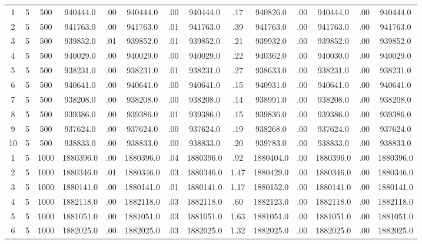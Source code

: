 \documentclass[12pt,a4paper]{article}
\begin{document}
\begin{center}
{\begin{tabular}{|ccc|cc|cc|cc|cc|cc|c|}
1             &   5& 500& 940444.0&  .00& 940444.0&  .00& 940444.0&  .17& 940826.0&  .00& 940444.0&  .00& 940444.0\\[-0.01in]
2             &   5& 500& 941763.0&  .00& 941763.0&  .01& 941763.0&  .39& 941763.0&  .00& 941763.0&  .00& 941763.0\\[-0.01in]
3             &   5& 500& 939852.0&  .01& 939852.0&  .01& 939852.0&  .21& 939932.0&  .00& 939852.0&  .00& 939852.0\\[-0.01in]
4             &   5& 500& 940029.0&  .00& 940029.0&  .00& 940029.0&  .22& 940362.0&  .00& 940030.0&  .00& 940029.0\\[-0.01in]
5             &   5& 500& 938231.0&  .00& 938231.0&  .01& 938231.0&  .27& 938633.0&  .00& 938231.0&  .00& 938231.0\\[-0.01in]
6             &   5& 500& 940641.0&  .00& 940641.0&  .00& 940641.0&  .15& 940931.0&  .00& 940641.0&  .00& 940641.0\\[-0.01in]
7             &   5& 500& 938208.0&  .00& 938208.0&  .00& 938208.0&  .14& 938991.0&  .00& 938208.0&  .00& 938208.0\\[-0.01in]
8             &   5& 500& 939386.0&  .00& 939386.0&  .01& 939386.0&  .15& 939836.0&  .00& 939386.0&  .00& 939386.0\\[-0.01in]
9             &   5& 500& 937624.0&  .00& 937624.0&  .00& 937624.0&  .19& 938268.0&  .00& 937624.0&  .00& 937624.0\\[-0.01in]
10            &   5& 500& 938833.0&  .00& 938833.0&  .00& 938833.0&  .20& 939783.0&  .00& 938833.0&  .00& 938833.0\\[-0.01in]
1             &   5&1000&1880396.0&  .00&1880396.0&  .04&1880396.0&  .92&1880404.0&  .00&1880396.0&  .00&1880396.0\\[-0.01in]
2             &   5&1000&1880346.0&  .01&1880346.0&  .03&1880346.0& 1.47&1880429.0&  .00&1880346.0&  .00&1880346.0\\[-0.01in]
3             &   5&1000&1880141.0&  .00&1880141.0&  .01&1880141.0& 1.17&1880152.0&  .00&1880141.0&  .00&1880141.0\\[-0.01in]
4             &   5&1000&1882118.0&  .00&1882118.0&  .03&1882118.0&  .60&1882123.0&  .00&1882118.0&  .00&1882118.0\\[-0.01in]
5             &   5&1000&1881051.0&  .00&1881051.0&  .03&1881051.0& 1.63&1881051.0&  .00&1881051.0&  .00&1881051.0\\[-0.01in]
6             &   5&1000&1882025.0&  .00&1882025.0&  .03&1882025.0& 1.32&1882025.0&  .00&1882025.0&  .00&1882025.0\\[-0.01in]

\end{tabular}}
\end{center}
\end{document}
